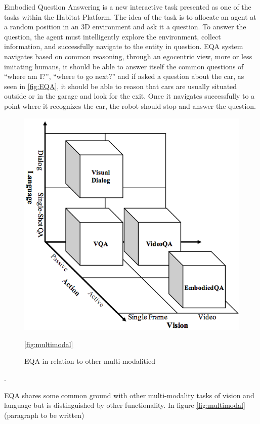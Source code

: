 Embodied Question Answering is a new interactive task presented as one of the tasks within the Habitat Platform\cite{embodiedqa}. The idea of the task is to allocate an agent at a random position in an  3D environment and ask it a question. To answer the question, the agent must intelligently explore the environment, collect information, and successfully navigate to the entity in question. EQA system navigates based on common reasoning, through an egocentric view, more or less imitating humans, it should be able to answer itself the common questions of “where am I?”, “where to go next?” and if asked a question about the car, as seen in \ref{fig:EQA}, it should be able to reason that cars are usually situated outside or in the garage and look for the exit. Once it navigates successfully to a point where it recognizes the car, the robot should stop and answer the question.  


\begin{figure}[H]
\includegraphics[scale=0.3]{images/Vision-language.png}
\caption{EQA in relation to other multi-modalitied  }
\ref{fig:multimodal}
\end{figure}.


 EQA shares some common ground with other multi-modality tasks of vision and language but is distinguished by other functionality. In figure \ref{fig:multimodal}  (paragraph to be written)



